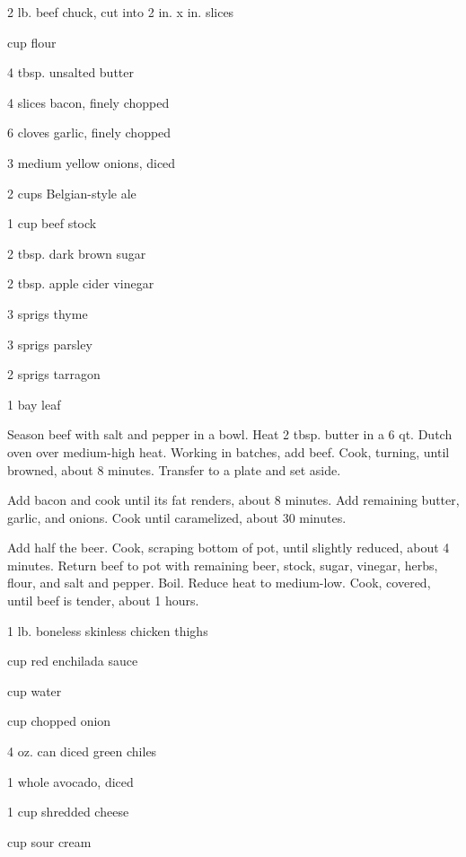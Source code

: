 \documentclass{cookbook}
\begin{document}

\begin{ingredients}
    \item 2 lb. beef chuck, cut into 2 in. x  in. slices
    \item {} cup flour
    \item 4 tbsp. unsalted butter
    \item 4 slices bacon, finely chopped
    \item 6 cloves garlic, finely chopped
    \item 3 medium yellow onions, diced
    \item 2 cups Belgian-style ale
    \item 1 cup beef stock
    \item 2 tbsp. dark brown sugar
    \item 2 tbsp. apple cider vinegar
    \item 3 sprigs thyme
    \item 3 sprigs parsley
    \item 2 sprigs tarragon
    \item 1 bay leaf
\end{ingredients}

Season beef with salt and pepper in a bowl. Heat 2 tbsp. butter in a 6 qt. Dutch oven over medium-high heat. Working in batches, add beef. Cook, turning, until browned, about 8 minutes. Transfer to a plate and set aside.

Add bacon and cook until its fat renders, about 8 minutes. Add remaining butter, garlic, and onions. Cook until caramelized, about 30 minutes.

Add half the beer. Cook, scraping bottom of pot, until slightly reduced, about 4 minutes. Return beef to pot with remaining beer, stock, sugar, vinegar, herbs, flour, and salt and pepper. Boil. Reduce heat to medium-low. Cook, covered, until beef is tender, about 1  hours.


\begin{ingredients}
    \item 1 lb. boneless skinless chicken thighs
    \item {} cup red enchilada sauce
    \item {} cup water
    \item {} cup chopped onion
    \item 4 oz. can diced green chiles
    \item 1 whole avocado, diced
    \item 1 cup shredded cheese
    \item {} cup sour cream
\end{ingredients}
\end{document}
